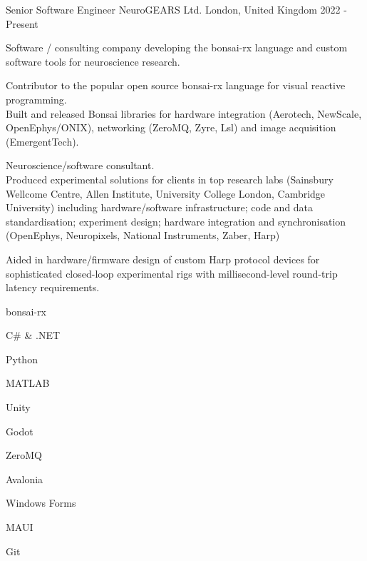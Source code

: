 

\begin{cventries}

  \cventry%
    {Senior Software Engineer} %
    {NeuroGEARS Ltd.} %
    {London, United Kingdom} %
    {2022 \-- Present} %
    {
      \begin{cvsentence}Software / consulting company developing the bonsai-rx language and custom software tools for neuroscience research.\end{cvsentence}
      \begin{cvitems} %
        \item {Contributor to the popular open source bonsai-rx language for visual reactive programming.} \\
        Built and released Bonsai libraries for hardware integration (Aerotech, NewScale, OpenEphys/ONIX), networking (ZeroMQ, Zyre, Lsl) and image acquisition (EmergentTech).
        \item {Neuroscience/software consultant.} \\
        Produced experimental solutions for clients in top research labs (Sainsbury Wellcome Centre, Allen Institute, University College London, Cambridge University) including hardware/software infrastructure; code and data standardisation; experiment design; hardware integration and synchronisation (OpenEphys, Neuropixels, National Instruments, Zaber, Harp)
        \item {Aided in hardware/firmware design of custom Harp protocol devices for sophisticated closed-loop experimental rigs with millisecond-level round-trip latency requirements.}
      \end{cvitems}
    }
    \begin{cventryskills}
      \item bonsai-rx
      \item C\# \& .NET
      \item Python
      \item MATLAB
      \item Unity
      \item Godot
      \item ZeroMQ
      \item Avalonia
      \item Windows Forms
      \item MAUI
      \item Git
    \end{cventryskills}


\end{cventries}
